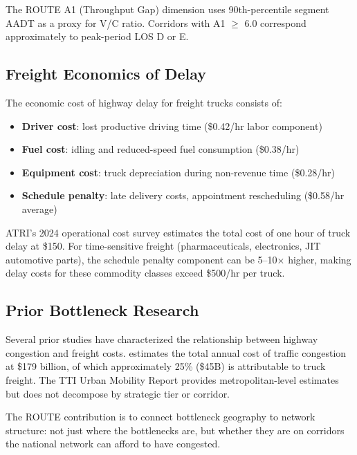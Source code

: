 The ROUTE A1 (Throughput Gap) dimension uses 90th-percentile segment AADT as a proxy for V/C ratio. Corridors with A1 $\geq$ 6.0 correspond approximately to peak-period LOS D or E.

\subsection{Freight Economics of Delay}

The economic cost of highway delay for freight trucks consists of:

\begin{itemize}
\item \textbf{Driver cost}: lost productive driving time (\$0.42/hr labor component)
\item \textbf{Fuel cost}: idling and reduced-speed fuel consumption (\$0.38/hr)
\item \textbf{Equipment cost}: truck depreciation during non-revenue time (\$0.28/hr)
\item \textbf{Schedule penalty}: late delivery costs, appointment rescheduling (\$0.58/hr average)
\end{itemize}

ATRI's 2024 operational cost survey estimates the total cost of one hour of truck delay at \$150. For time-sensitive freight (pharmaceuticals, electronics, JIT automotive parts), the schedule penalty component can be 5--10× higher, making delay costs for these commodity classes exceed \$500/hr per truck.

\subsection{Prior Bottleneck Research}

Several prior studies have characterized the relationship between highway congestion and freight costs. \citet{Schrank2021} estimates the total annual cost of traffic congestion at \$179 billion, of which approximately 25\% (\$45B) is attributable to truck freight. The TTI Urban Mobility Report provides metropolitan-level estimates but does not decompose by strategic tier or corridor.

The ROUTE contribution is to connect bottleneck geography to network structure: not just where the bottlenecks are, but whether they are on corridors the national network can afford to have congested.
